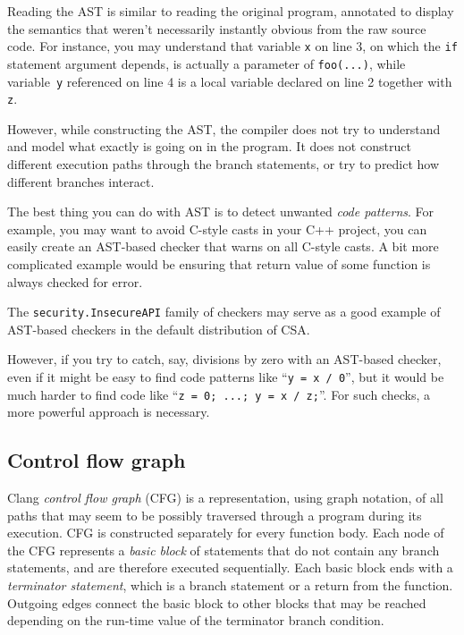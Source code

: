 \documentclass[a4paper,12pt]{article}
\begin{document}
Reading the AST is similar to reading the original program, annotated to display the semantics that weren't necessarily instantly obvious from the raw source code. For instance, you may understand that variable \lstinline|x| on line 3, on which the \lstinline|if| statement argument depends, is actually a parameter of \lstinline|foo(...)|, while variable~\lstinline|y| referenced on line 4 is a local variable declared on line 2 together with \lstinline|z|.

However, while constructing the AST, the compiler does not try to understand and model what exactly is going on in the program. It does not construct different execution paths through the branch statements, or try to predict how different branches interact.

The best thing you can do with AST is to detect unwanted \emph{code patterns}. For example, you may want to avoid C-style casts in your C++ project, you can easily create an AST-based checker that warns on all C-style casts. A bit more complicated example would be ensuring that return value of some function is always checked for error.

The \lstinline|security.InsecureAPI| family of checkers may serve as a good example of AST-based checkers in the default distribution of CSA.

However, if you try to catch, say, divisions by zero with an AST-based checker, even if it might be easy to find code patterns like ``\lstinline|y = x / 0|'', but it would be much harder to find code like ``\lstinline|z = 0; ...; y = x / z;|''. For such checks, a more powerful approach is necessary.

\subsection{Control flow graph}

Clang \emph{control flow graph} (CFG) is a representation, using graph notation, of all paths that may seem to be possibly traversed through a program during its execution. CFG is constructed separately for every function body. Each node of the CFG represents a \emph{basic block} of statements that do not contain any branch statements, and are therefore executed sequentially. Each basic block ends with a \emph{terminator statement}, which is a branch statement or a return from the function. Outgoing edges connect the basic block to other blocks that may be reached depending on the run-time value of the terminator branch condition.
\end{document}
